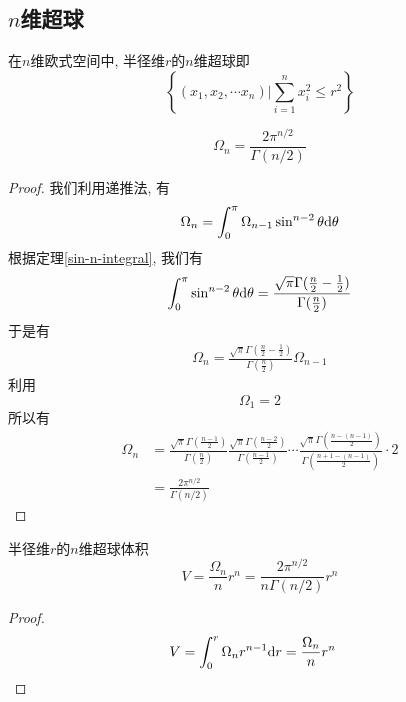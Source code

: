 \subsection{$n$维超球}
\begin{definition}[n维超球]
    在$n$维欧式空间中, 半径维$r$的$n$维超球即
    \begin{equation}
        \left\{(x_1,x_2, \cdots x_n)|\sum_{i=1}^n x_i^2\leq r^2\right\}
    \end{equation}
\end{definition}
\begin{theorem}[$n$维超球面角]
    \begin{equation}
        \Omega_n=\frac{2\pi^{n/2}}{\Gamma(n/2)}
    \end{equation}
\end{theorem}
\begin{proof}
    我们利用递推法, 有
    \begin{align}
        \Omega_n=\int_0^\pi\Omega_{n-1}\sin^{n-2}\theta\mathrm d\theta
    \end{align}
    根据定理\ref{sin-n-integral}, 我们有
    \begin{equation}
        \int_0^\pi\sin^{n-2}\theta\mathrm d\theta=\frac{\sqrt\pi\Gamma(\frac n2-\frac 12)}{\Gamma(\frac n2)}
    \end{equation}
    于是有
    \begin{align}
        \Omega_n=\frac{\sqrt\pi\Gamma(\frac n2-\frac 12)}{\Gamma(\frac n2)}\Omega_{n-1}
    \end{align}
    利用
    \begin{equation}
        \Omega_1=2
    \end{equation}
    所以有
    \begin{align}
        \Omega_n&=\frac{\sqrt\pi\Gamma(\frac{n-1}2)}{\Gamma(\frac n2)}\frac{\sqrt\pi\Gamma(\frac{n-2}2)}{\Gamma(\frac {n-1}2)}\cdots\frac{\sqrt\pi\Gamma(\frac{n-(n-1)}2)}{\Gamma(\frac {n+1-(n-1)}2)}\cdot2\\
        &=\frac{2\pi^{n/2}}{\Gamma(n/2)}
    \end{align}
\end{proof}

\begin{theorem}[n维超球体积]
    半径维$r$的$n$维超球体积
    \begin{equation}
        V=\frac{\Omega_n}{n}r^n=\frac{2\pi^{n/2}}{n\Gamma(n/2)}r^n
    \end{equation}
\end{theorem}
\begin{proof}
    \begin{align}
        V&=\int_0^r\Omega_n r^{n-1}\mathrm d r=\frac{\Omega_n}{n}r^n
    \end{align}
\end{proof}

